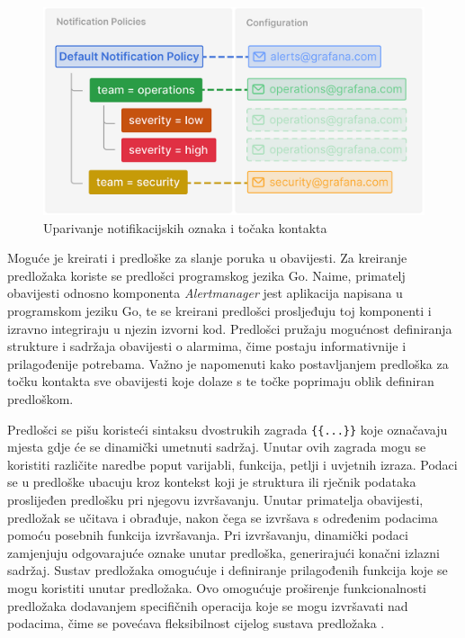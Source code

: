 \begin{figure}[ht]
	\centering
	\includegraphics[scale=0.4]{imgs/labels_and_notifs}
	\caption{Uparivanje notifikacijskih oznaka i točaka kontakta \cite{grafana}}
	\label{fig:labels_and_notifs}
\end{figure}

Moguće je kreirati i predloške za slanje poruka u obavijesti. Za kreiranje predložaka koriste se predlošci programskog jezika Go. Naime, primatelj obavijesti odnosno komponenta \textit{Alertmanager} jest aplikacija napisana u programskom jeziku Go, te se kreirani predlošci prosljeđuju toj komponenti i izravno integriraju u njezin izvorni kod. Predlošci pružaju mogućnost definiranja strukture i sadržaja obavijesti o alarmima, čime postaju informativnije i prilagođenije potrebama. Važno je napomenuti kako postavljanjem predloška za točku kontakta sve obavijesti koje dolaze s te točke poprimaju oblik definiran predloškom. 

Predlošci se pišu koristeći sintaksu dvostrukih zagrada \lstinline|{{...}}| koje označavaju mjesta gdje će se dinamički umetnuti sadržaj. Unutar ovih zagrada mogu se koristiti različite naredbe poput varijabli, funkcija, petlji i uvjetnih izraza. Podaci se u predloške ubacuju kroz kontekst koji je struktura ili rječnik podataka proslijeđen predlošku pri njegovu izvršavanju. Unutar primatelja obavijesti, predložak se učitava i obrađuje, nakon čega se izvršava s određenim podacima pomoću posebnih funkcija izvršavanja. Pri izvršavanju, dinamički podaci zamjenjuju odgovarajuće oznake unutar predloška, generirajući konačni izlazni sadržaj. Sustav predložaka omogućuje i definiranje prilagođenih funkcija koje se mogu koristiti unutar predložaka. Ovo omogućuje proširenje funkcionalnosti predložaka dodavanjem specifičnih operacija koje se mogu izvršavati nad podacima, čime se povećava fleksibilnost cijelog sustava predložaka \cite{go_templating}. 

